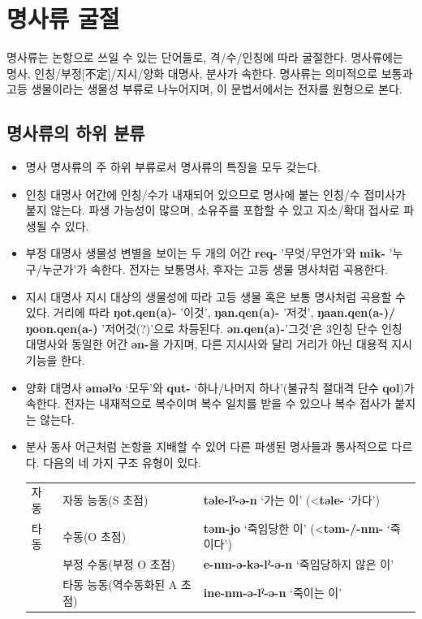 \section{명사류 굴절}
명사류는 논항으로 쓰일 수 있는 단어들로, 격/수/인칭에 따라 굴절한다. 명사류에는 명사, 인칭/부정[不定]/지시/양화 대명사, 분사가 속한다. 명사류는 의미적으로 보통과 고등 생물이라는 생물성 부류로 나누어지며, 이 문법서에서는 전자를 원형으로 본다.
\subsection{명사류의 하위 분류}
\begin{itemize}
	\item{명사} 명사류의 주 하위 부류로서 명사류의 특징을 모두 갖는다.
	\item{인칭 대명사} 어간에 인칭/수가 내재되어 있으므로 명사에 붙는 인칭/수 접미사가 붙지 않는다. 파생 가능성이 많으며, 소유주를 포합할 수 있고 지소/확대 접사로 파생될 수 있다.
	\item{부정 대명사} 생물성 변별을 보이는 두 개의 어간 \textbf{req-} '무엇/무언가'와 \textbf{mik-} '누구/누군가'가 속한다. 전자는 보통명사, 후자는 고등 생물 명사처럼 곡용한다.
	\item{지시 대명사} 지시 대상의 생물성에 따라 고등 생물 혹은 보통 명사처럼 곡용할 수 있다. 거리에 따라 \textbf{ŋot.qen(a)-} '이것', \textbf{ŋan.qen(a)-} '저것', \textbf{ŋaan.qen(a-)/ŋoon.qen(a-)} '저어것(?)'으로 차등된다. \textbf{ən.qen(a)-}'그것'은 3인칭 단수 인칭 대명사와 동일한 어간 \textbf{ən-}을 가지며, 다른 지시사와 달리 거리가 아닌 대용적 지시 기능을 한다.
	\item{양화 대명사} \textbf{əməlˀo} `모두’와 \textbf{qut-} `하나/나머지 하나'(불규칙 절대격 단수 \textbf{qol})가 속한다. 전자는 내재적으로 복수이며 복수 일치를 받을 수 있으나 복수 접사가 붙지는 않는다.
	\item{분사} 동사 어근처럼 논항을 지배할 수 있어 다른 파생된 명사들과 통사적으로 다르다. 다음의 네 가지 구조 유형이 있다.
	\begin{center}
	\begin{tabular}{lll}
	자동 &자동 능동(S 초점) &\textbf{təle-lˀ-ə-n} `가는 이' (<\textbf{təle-} `가다')\\
	타동 &수동(O 초점) &\textbf{təm-jo} `죽임당한 이' (<\textbf{təm-/-nm-} `죽이다')\\
		&부정 수동(부정 O 초점) &\textbf{e-nm-ə-kə-lˀ-ə-n} `죽임당하지 않은 이'\\
		&타동 능동(역수동화된 A 초점) &\textbf{ine-nm-ə-lˀ-ə-n} `죽이는 이'\\
	\end{tabular}
	\end{center}
\end{itemize}
